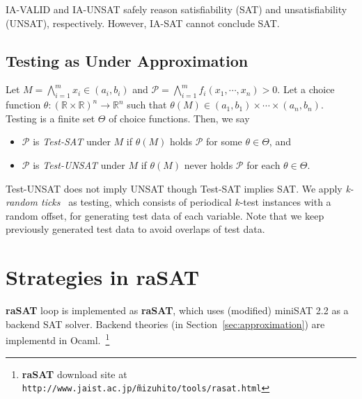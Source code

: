 \documentclass[runningheads,a4paper,oribibl]{llncs}
\newcommand{\Real}{{\mathbb R}}
\begin{document}
IA-VALID and IA-UNSAT safely reason satisfiability (SAT) and unsatisfiability (UNSAT), 
respectively. However, IA-SAT cannot conclude SAT. 

\subsection{Testing as Under Approximation} \label{sec:test}


\begin{definition}\label{def:testing}
Let $M = \bigwedge \limits_{i=1}^m x_i \in (a_i,b_i)$ and 
${\mathcal P} = \bigwedge \limits_{i=1}^m f_i(x_1,\cdots,x_n) > 0$. 
%
Let a choice function $\theta : (\Real \times \Real)^n \rightarrow \Real^n$ 
such that $\theta(M) \in (a_1,b_1) \times \cdots \times (a_n,b_n)$. 
Testing is a finite set $\Theta$ of choice functions. Then, we say 
\begin{itemize}
\item ${\mathcal P}$ is \emph{Test-SAT} under $M$ if $\theta(M)$ holds ${\mathcal P}$ 
for some $\theta \in \Theta$, and 
\item ${\mathcal P}$ is \emph{Test-UNSAT} under $M$ if $\theta(M)$ never holds ${\mathcal P}$ 
for each $\theta \in \Theta$. 
\end{itemize} 
\end{definition}

Test-UNSAT does not imply UNSAT though Test-SAT implies SAT. 
We apply \emph{k-random ticks}~\cite{tapas12} as testing, which consists of periodical $k$-test instances 
with a random offset, for generating test data of each variable.
Note that we keep previously generated test data to avoid overlaps of test data. 


\section {Strategies in raSAT} \label{sec:strategy}

{\bf raSAT} loop is implemented as {\bf raSAT}, 
which uses (modified) miniSAT 2.2 as a backend SAT solver. 
Backend theories (in Section~\ref{sec:approximation}) are implementd 
in Ocaml.~\footnote{{\bf raSAT} download site at {\tt http://www.jaist.ac.jp/\~mizuhito/tools/rasat.html}}
\end{document}
